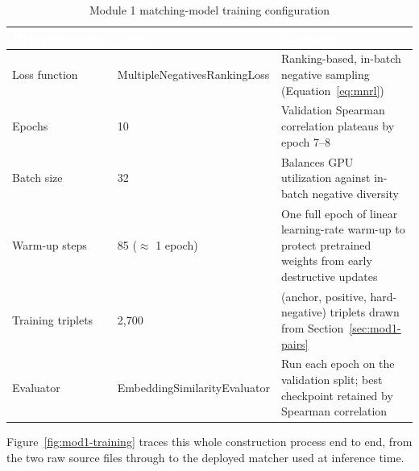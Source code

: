 \documentclass[11pt,a4paper]{article}
\newcommand{\hdrow}{\rowcolor{TPnavy}}
\newcommand{\hdtxt}[1]{\textcolor{white}{\bfseries #1}}
\begin{document}
\begin{table}[H]
\centering
\caption{Module 1 matching-model training configuration}
\label{tab:mod1-hyperparams}
\small
\begin{tabular}{p{3.2cm}p{3.3cm}p{6.9cm}}
\toprule
\hdrow \hdtxt{Hyperparameter} & \hdtxt{Value} & \hdtxt{Rationale} \\
\midrule
Loss function & Multiple\-Negatives\-Ranking\-Loss & Ranking-based, in-batch negative sampling (Equation~\ref{eq:mnrl}) \\
\rowcolor{TPlight}
Epochs & 10 & Validation Spearman correlation plateaus by epoch 7--8 \\
Batch size & 32 & Balances GPU utilization against in-batch negative diversity \\
\rowcolor{TPlight}
Warm-up steps & 85 ($\approx$ 1 epoch) & One full epoch of linear learning-rate warm-up to protect pretrained weights from early destructive updates \\
Training triplets & 2{,}700 & (anchor, positive, hard-negative) triplets drawn from Section~\ref{sec:mod1-pairs} \\
\rowcolor{TPlight}
Evaluator & Embedding\-Similarity\-Evaluator & Run each epoch on the validation split; best checkpoint retained by Spearman correlation \\
\bottomrule
\end{tabular}
\end{table}

Figure~\ref{fig:mod1-training} traces this whole construction process end to end, from the two raw source files through to the deployed matcher used at inference time.
\end{document}
